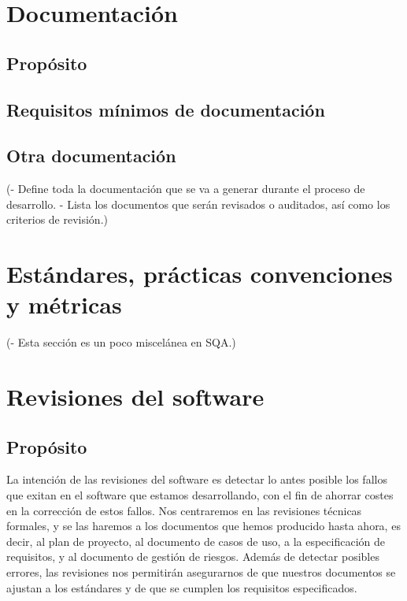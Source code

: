 \documentclass[spanish,a4paper,11pt, twoside]{report}	%
\begin{document}
\newpage
\mbox{}
\thispagestyle{empty}						%
\newpage

\chapter{ Documentación}%
	\section{Propósito}
	\section{Requisitos mínimos de documentación}
	\section{Otra documentación}

	(- Define toda la documentación que se va a generar
	durante el proceso de desarrollo.
	- Lista los documentos que serán revisados o
	auditados, así como los criterios de revisión.)

\newpage
\mbox{}
\thispagestyle{empty}						%
\newpage

\chapter{ Estándares, prácticas convenciones y métricas}
	(- Esta sección es un poco miscelánea en SQA.) %

\newpage
\mbox{}
\thispagestyle{empty}						%
\newpage

\chapter{ Revisiones del software}
	\section{Propósito}
	La intención de las revisiones del software es detectar lo antes posible los fallos que exitan en el software que estamos desarrollando, con el fin de ahorrar costes en la corrección de estos fallos. Nos centraremos en las revisiones técnicas formales,
	y se las haremos a los documentos que hemos producido hasta ahora, es decir, al plan de proyecto, al documento de casos de uso, a la especificación de requisitos, y al documento de gestión de riesgos. Además de detectar posibles errores,
 	las revisiones nos permitirán asegurarnos de que nuestros documentos se ajustan a los estándares y de que se cumplen los requisitos especificados.
\end{document}
